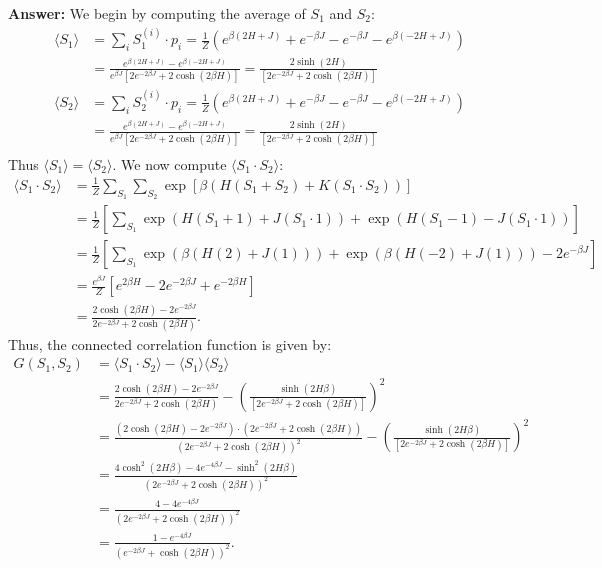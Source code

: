 \documentclass[a4paper]{article}
\newcommand{\newparagraph}{\vspace{.5cm}\noindent}
\newcommand{\average}[1]{\langle #1 \rangle}
\begin{document}
\newparagraph
\textbf{Answer:} We begin by computing the average of $S_1$ and $S_2$:
\begin{align*}
    \average{S_1} &= \sum_i S_1^{(i)} \cdot p_i = \frac{1}{Z}\left(e^{\beta(2H + J)} + e^{-\beta J} - e^{-\beta J} - e^{\beta(-2H + J)}\right)\\
    &= \frac{e^{\beta(2H + J)} - e^{\beta(-2H + J)}}{e^{\beta J}\left[2e^{-2\beta J} + 2\cosh(2\beta H)\right]} = \frac{2\sinh(2H)}{\left[2e^{-2\beta J} + 2\cosh(2\beta H)\right]}\\
    \average{S_2} &= \sum_i S_2^{(i)} \cdot p_i = \frac{1}{Z}\left(e^{\beta(2H + J)} + e^{-\beta J} - e^{-\beta J} - e^{\beta(-2H + J)}\right)\\
    &= \frac{e^{\beta(2H + J)} - e^{\beta(-2H + J)}}{e^{\beta J}\left[2e^{-2\beta J} + 2\cosh(2\beta H)\right]} = \frac{2\sinh(2H)}{\left[2e^{-2\beta J} + 2\cosh(2\beta H)\right]}\\
\end{align*}Thus $\average{S_1} = \average{S_2}$. We now compute $\average{S_1\cdot S_2}$:
\begin{align*}
    \average{S_1\cdot S_2} &=\frac{1}{Z}\sum_{S_1}\sum_{S_2}\exp\left[\beta\left(H(S_1 + S_2) + K(S_1\cdot S_2)\right)\right]\\
    &= \frac{1}{Z}\left[\sum_{S_1}\exp\left(H(S_1 + 1) + J(S_1\cdot 1)\right) + \exp\left(H(S_1 - 1) - J(S_1 \cdot1)\right)\right]\\
    &= \frac{1}{Z}\left[\sum_{S_1}\exp\left(\beta(H(2) + J(1))\right) + \exp\left(\beta(H(-2) + J(1))\right) - 2e^{-\beta J}\right]\\
    &=\frac{e^{\beta J}}{Z}\left[e^{2\beta H} - 2e^{-2\beta J} + e^{-2\beta H}\right]\\
    &= \frac{2\cosh(2\beta H)-2e^{-2\beta J}}{2e^{-2\beta J} + 2\cosh(2\beta H)}.
\end{align*}Thus, the connected correlation function is given by:
\begin{align*}
    G(S_1,S_2) &= \average{S_1\cdot S_2} - \average{S_1}\average{S_2}\\
    &= \frac{2\cosh(2\beta H)-2e^{-2\beta J}}{2e^{-2\beta J} + 2\cosh(2\beta H)} - \left(\frac{\sinh(2H\beta)}{\left[2e^{-2\beta J} + 2\cosh(2\beta H)\right]}\right)^2\\
    &= \frac{\left(2\cosh(2\beta H)-2e^{-2\beta J}\right)\cdot(2e^{-2\beta J} + 2\cosh(2\beta H))}{(2e^{-2\beta J} + 2\cosh(2\beta H))^2} - \left(\frac{\sinh(2H\beta)}{\left[2e^{-2\beta J} + 2\cosh(2\beta H)\right]}\right)^2\\
    &= \frac{4\cosh^2\left(2H\beta\right) - 4 e^{-4\beta J}-\sinh^2\left(2H\beta\right)}{(2e^{-2\beta J} + 2\cosh(2\beta H))^2}\\
    &= \frac{4 - 4 e^{-4\beta J}}{(2e^{-2\beta J} + 2\cosh(2\beta H))^2}\\
    &= \frac{1-e^{-4\beta J}}{\left(e^{-2\beta J} + \cosh(2\beta H)\right)^2}.
\end{align*}
\end{document}
